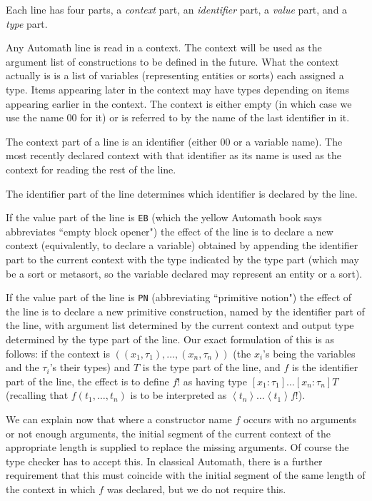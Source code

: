 \documentclass{article}
\begin{document}
Each line has four parts, a {\em context\/} part, an {\em identifier\/} part, a {\em value\/} part, and a {\em type\/} part.

Any Automath line is read in a context.  The context will be used as the argument list of constructions to be defined in the future.  What the context actually is is a list of variables (representing entities or sorts) each assigned a type.  Items appearing later in the context may have types depending on items appearing earlier in the context.  The context is either empty (in which case we use the name 00 for it) or is referred to by the name of the last identifier in it.

The context part of a line is an identifier (either 00 or a variable name).  The most recently declared context with that identifier as its name
is used as the context for reading the rest of the line.

The identifier part of the line determines which identifier is declared by the line.

If the value part of the line is {\tt EB} (which the yellow Automath book says abbreviates ``empty block opener") the effect of the line is to declare a new context (equivalently, to declare a variable) obtained by appending the identifier part to the current context with the type indicated by the type part
(which may be a sort or metasort, so the variable declared may represent an entity or a sort).

If the value part of the line is {\tt PN} (abbreviating ``primitive notion") the effect of the line is to declare a new primitive construction, named by the identifier part of the line, with argument list determined by the current context and output type determined by the type part of the line.  Our exact formulation of this
is as follows:  if the context is $((x_1,\tau_1),\ldots,(x_n,\tau_n))$ (the $x_i$'s being the variables and the $\tau_i$'s their types) and $T$ is the type part of the line, and $f$ is the identifier part of the line, the effect is to define $f!$ as having type $[x_1:\tau_1]\ldots[x_n:\tau_n]T$ (recalling that
$f(t_1,\ldots,t_n)$ is to be interpreted as $\left<t_n\right>\ldots\left<t_1\right>f!$).

We can explain now that where a constructor name $f$ occurs with no arguments or not enough arguments, the initial segment of the current context of the appropriate length is supplied to replace the missing arguments.  Of course the type checker has to accept this.  In classical Automath, there is a further requirement that this must coincide with the initial segment of the same length of the context in which $f$ was declared, but we do not require this.
\end{document}
